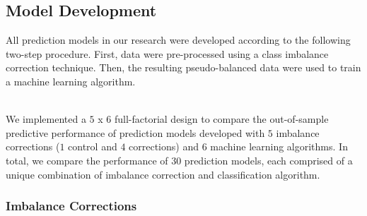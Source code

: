 \documentclass[AMA,STIX1COL,]{WileyNJD-v2}
\begin{document}
\hypertarget{model-development}{%
\subsection{Model Development}\label{model-development}}

All prediction models in our research were developed according to the
following two-step procedure. First, data were pre-processed using a
class imbalance correction technique. Then, the resulting
pseudo-balanced data were used to train a machine learning algorithm.\\
\strut \\
We implemented a \(5\) x \(6\) full-factorial design to compare the
out-of-sample predictive performance of prediction models developed with
\(5\) imbalance corrections (\(1\) control and \(4\) corrections) and
\(6\) machine learning algorithms. In total, we compare the performance
of 30 prediction models, each comprised of a unique combination of
imbalance correction and classification algorithm.

\hypertarget{imbalance-corrections}{%
\subsubsection{Imbalance Corrections}\label{imbalance-corrections}}
\end{document}
